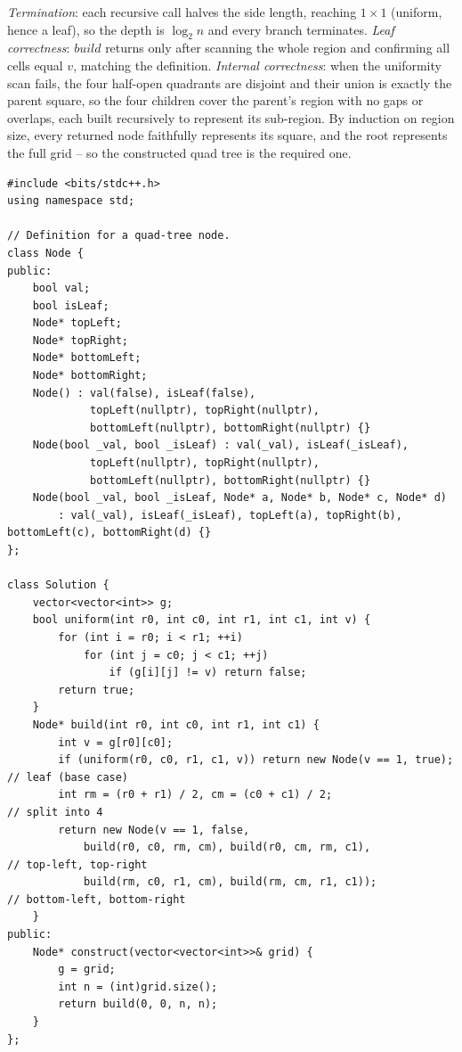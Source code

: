 \begin{proofbox}
\emph{Termination}: each recursive call halves the side length, reaching $1\times1$ (uniform,
hence a leaf), so the depth is $\log_2 n$ and every branch terminates. \emph{Leaf correctness}:
$\mathit{build}$ returns  only after scanning the whole region and confirming all
cells equal $v$, matching the definition. \emph{Internal correctness}: when the uniformity scan
fails, the four half-open quadrants are disjoint and their union is exactly the parent square, so the
four children cover the parent's region with no gaps or overlaps, each built recursively to
represent its sub-region. By induction on region size, every returned node faithfully represents its
square, and the root represents the full grid -- so the constructed quad tree is the required one. \end{proofbox}

\begin{lstlisting}[caption={Construct Quad Tree -- recursive partition of a uniform test (LeetCode 427)}, label={lst:c25-quad}]
#include <bits/stdc++.h>
using namespace std;

// Definition for a quad-tree node.
class Node {
public:
    bool val;
    bool isLeaf;
    Node* topLeft;
    Node* topRight;
    Node* bottomLeft;
    Node* bottomRight;
    Node() : val(false), isLeaf(false),
             topLeft(nullptr), topRight(nullptr),
             bottomLeft(nullptr), bottomRight(nullptr) {}
    Node(bool _val, bool _isLeaf) : val(_val), isLeaf(_isLeaf),
             topLeft(nullptr), topRight(nullptr),
             bottomLeft(nullptr), bottomRight(nullptr) {}
    Node(bool _val, bool _isLeaf, Node* a, Node* b, Node* c, Node* d)
        : val(_val), isLeaf(_isLeaf), topLeft(a), topRight(b), bottomLeft(c), bottomRight(d) {}
};

class Solution {
    vector<vector<int>> g;
    bool uniform(int r0, int c0, int r1, int c1, int v) {
        for (int i = r0; i < r1; ++i)
            for (int j = c0; j < c1; ++j)
                if (g[i][j] != v) return false;
        return true;
    }
    Node* build(int r0, int c0, int r1, int c1) {
        int v = g[r0][c0];
        if (uniform(r0, c0, r1, c1, v)) return new Node(v == 1, true);   // leaf (base case)
        int rm = (r0 + r1) / 2, cm = (c0 + c1) / 2;                     // split into 4
        return new Node(v == 1, false,
            build(r0, c0, rm, cm), build(r0, cm, rm, c1),              // top-left, top-right
            build(rm, c0, r1, cm), build(rm, cm, r1, c1));             // bottom-left, bottom-right
    }
public:
    Node* construct(vector<vector<int>>& grid) {
        g = grid;
        int n = (int)grid.size();
        return build(0, 0, n, n);
    }
};
\end{lstlisting}

